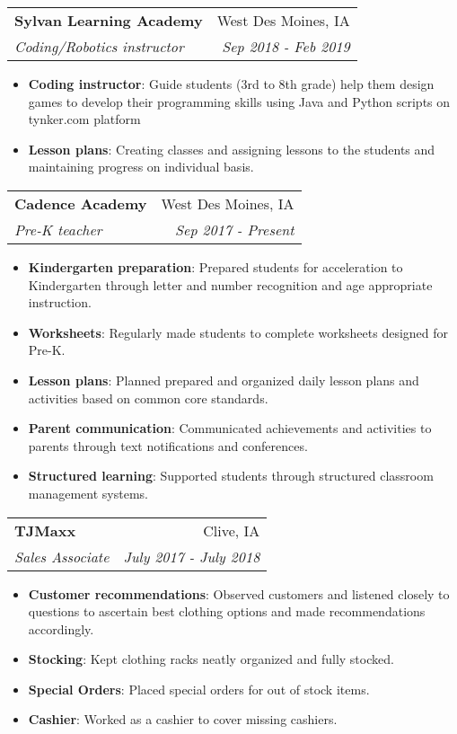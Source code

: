 \documentclass[letterpaper,11pt]{article}
\makeatletter
\newcommand{\resumeItem}[2]{
  \item\small{
    \textbf{#1}{: #2 \vspace{-2pt}}
  }
}
\newcommand{\resumeSubheading}[4]{
  \vspace{-1pt}\item
    \begin{tabular*}{0.97\textwidth}[t]{l@{\extracolsep{\fill}}r}
      \textbf{#1} & #2 \\
      \textit{\small#3} & \textit{\small #4} \\
    \end{tabular*}\vspace{-5pt}
}
\newcommand{\resumeItemListStart}{\begin{itemize}}
\newcommand{\resumeItemListEnd}{\end{itemize}\vspace{-5pt}}
\newcommand{\resumeSubHeadingEnvironmentAndTools}[1]{} %
\newcommand{\cplusplus}{C\texttt{++}}
\makeatother
\begin{document}
   \resumeSubheading
      {Sylvan Learning Academy}{West Des Moines, IA}
      {Coding/Robotics instructor}{Sep 2018 - Feb 2019}
      \resumeItemListStart
        \resumeItem{Coding instructor}
	 {Guide students (3rd to 8th grade) help them design games to develop their programming skills using Java and Python scripts on tynker.com platform}
        \resumeItem{Lesson plans}
	 {Creating classes and assigning lessons to the students and maintaining progress on individual basis.}

      \resumeItemListEnd

   \resumeSubheading
      {Cadence Academy}{West Des Moines, IA}
      {Pre-K teacher}{Sep 2017 - Present}
      \resumeItemListStart
        \resumeItem{Kindergarten preparation}
	 {Prepared students for acceleration to Kindergarten through letter and number recognition and age appropriate instruction.}
        \resumeItem{Worksheets}
	 {Regularly made students to complete worksheets designed for Pre-K.}
        \resumeItem{Lesson plans}
	 {Planned prepared and organized daily lesson plans and activities based on common core standards.}
        \resumeItem{Parent communication}
         {Communicated achievements and activities to parents through text notifications and conferences.}
        \resumeItem{Structured learning}
         {Supported students through structured classroom management systems.}

      \resumeItemListEnd
      \resumeSubHeadingEnvironmentAndTools{\cplusplus, JavaScript, Unix(AIX,  HP-UX,  Solaris), RAPID(UI development framework), SQL, ComDB, STL, FIX-protocol, Service orientied architecture, XML, Multithreading (IPC), OOP, svn.}


    \resumeSubheading
      {TJMaxx}{Clive, IA}
      {Sales Associate}{July 2017 - July 2018}
      \resumeItemListStart
        \resumeItem{Customer recommendations} 
	{Observed customers and listened closely to questions to ascertain best clothing options and made recommendations accordingly.}
        \resumeItem{Stocking} 
	{Kept clothing racks neatly organized and fully stocked.}
        \resumeItem{Special Orders} 
	{Placed special orders for out of stock items.}
        \resumeItem{Cashier} 
	{Worked as a cashier to cover missing cashiers.}
      \resumeItemListEnd
      \resumeSubHeadingEnvironmentAndTools{\cplusplus, Linux  IPCs,  Multithreading, Windriver  Linux,  PowerPC,  bash  scripting,  PVCS(version control), sqlite-db, awk, sed, valgrind}
\end{document}
